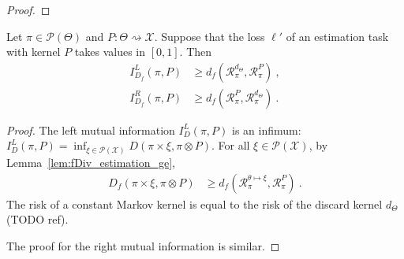 \begin{proof}%
\uses{}

\end{proof}


\begin{lemma}
  \label{lem:mutualInfoLeft_estimation_ge}
  Let $\pi \in \mathcal P(\Theta)$ and $P : \Theta \rightsquigarrow \mathcal X$. Suppose that the loss $\ell'$ of an estimation task with kernel $P$ takes values in $[0,1]$. Then
  \begin{align*}
  I_{D_f}^L(\pi, P)
  &\ge d_f(\mathcal R_\pi^{d_\Theta}, \mathcal R_\pi^P)
  \: , \\
  I_{D_f}^R(\pi, P)
  &\ge d_f(\mathcal R_\pi^P, \mathcal R_\pi^{d_\Theta})
  \: .
  \end{align*}
\end{lemma}

\begin{proof}%
{}
The left mutual information $I_D^L(\pi, P)$ is an infimum: $I_D^L(\pi, P) = \inf_{\xi \in \mathcal P(\mathcal X)} D(\pi \times \xi, \pi \otimes P)$.
For all $\xi \in \mathcal P(\mathcal X)$, by Lemma~\ref{lem:fDiv_estimation_ge},
\begin{align*}
D_f(\pi \times \xi, \pi \otimes P) &\ge d_f(\mathcal R_\pi^{\theta \mapsto \xi}, \mathcal R_\pi^P) \: .
\end{align*}
The risk of a constant Markov kernel is equal to the risk of the discard kernel $d_\Theta$ (TODO ref).

The proof for the right mutual information is similar.
\end{proof}

